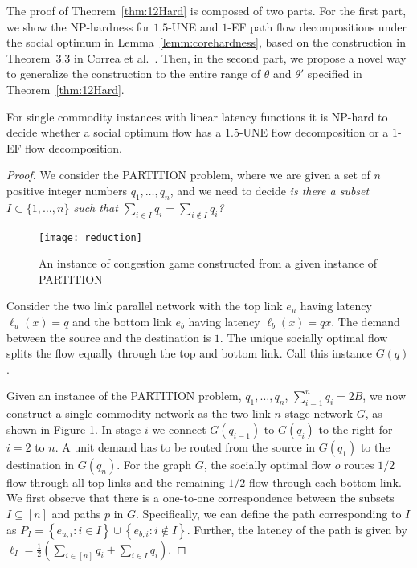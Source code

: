 The proof of Theorem~\ref{thm:12Hard} is composed of two parts.  For the first part, we show the NP-hardness for $1.5$-UNE and $1$-EF path flow decompositions under the social optimum  in Lemma~\ref{lemm:corehardness}, based on the construction in Theorem~3.3 in Correa et al.~\cite{correa2007fast}.  Then, in the second part, we propose a novel way to generalize the construction to the entire range of $\theta$ and $\theta'$ specified in Theorem~\ref{thm:12Hard}.

\begin{lemma}\label{lemm:corehardness}
For single commodity instances with linear latency functions it is NP-hard to decide whether a social optimum flow has a $1.5$-UNE flow decomposition or a $1$-EF flow decomposition.
\end{lemma}
\begin{proof}
We consider the PARTITION problem, where we are given a set of $n$ positive integer numbers $q_1,\ldots, q_n$, and we need to decide  \emph{is there a subset $I \subset \{1,\ldots,n\}$ such that $\sum_{i\in I} q_i = \sum_{i \notin I}q_i$?}
 \begin{figure}[!htb]
 \centering
 \texttt{[image: reduction]}
 \caption{An instance of congestion game constructed from a given instance of PARTITION}
 \label{Fig:instForProg4}
 \end{figure}

Consider the two link parallel network with the top link $e_{u}$ having latency $\ell_u(x)=q$ and the bottom link $e_b$ having latency $\ell_b(x)=qx$. The demand between the source and the destination is $1$. 
The unique socially optimal flow splits the flow equally through the top and bottom link. Call this instance $G(q)$.

 
Given an instance of the PARTITION problem, $q_1,\ldots, q_n$, $\sum_{i=1}^{n} q_i=2B$, we now construct a single commodity network as the two link $n$ stage network $G$, as shown in Figure \ref{Fig:instForProg4}. In stage $i$ we connect $G(q_{i-1})$ to $G(q_{i})$ to the right for $i=2$ to $n$. A unit demand has to be routed from the source in $G(q_1)$ to the destination in $G(q_n)$.  For the graph $G$, the socially optimal flow $o$ routes $1/2$ flow through all top links and the remaining $1/2$ flow through each bottom link. We first observe that there is a one-to-one correspondence between the subsets $I\subseteq [n]$ and paths $p$ in $G$. Specifically, we can define the path corresponding to $I$ as $P_I=\left\{e_{u,i}: i\in I\right\} \cup \left\{e_{b,i}: i\notin I\right\}$. Further, the latency of the path is given by $\ell_I = \frac{1}{2}(\sum_{i\in [n]} q_i+\sum_{i\in I} q_i)$. 


\end{proof}
